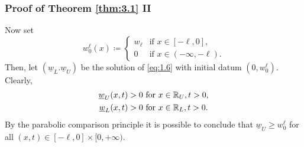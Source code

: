 
\begin{frame}
    \frametitle{Proof of Theorem \ref{thm:3.1} II}
    \begin{proofc}
        Now set 
    \begin{equation*}
        w_0^\ell(x) \coloneqq \begin{cases}
            w_\ell & \text{if } x \in [-\ell, 0], \\
            0 & \text{if } x \in (-\infty, -\ell).
        \end{cases}
    \end{equation*}
    Then, let \((\underline{w}_L. \underline{w}_U)\) be the solution of \eqref{eq:1.6} with initial datum \((0, w_0^\ell)\). Clearly,
    \begin{align*}
        \underline{w}_U(x, t) > 0 & \text{ for } x \in \mathbb{R}_U, t > 0, \\
        \underline{w}_L(x, t) > 0 & \text{ for } x \in \mathbb{R}_L, t > 0.
    \end{align*}
    By the parabolic comparison principle it is possible to conclude that \(\underline{w}_U \geq w_0^\ell\) for all \((x,t) \in [-\ell, 0] \times [0, +\infty)\).
    \end{proofc}
\end{frame}

